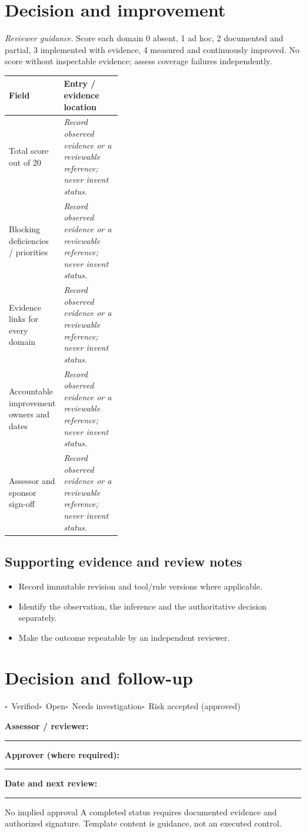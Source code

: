 \documentclass[10pt,letterpaper]{article}
\newcommand{\checkbox}{\(\square\)}
\newcommand{\blankline}{\noindent\rule{\linewidth}{0.35pt}\par\vspace{4pt}}
\begin{document}
\section{Decision and improvement}
\textit{Reviewer guidance.} Score each domain 0 absent, 1 ad hoc, 2 documented and partial, 3 implemented with evidence, 4 measured and continuously improved. No score without inspectable evidence; assess coverage failures independently.
\begin{tabularx}{\linewidth}{@{}p{0.38\linewidth}Y@{}}
\toprule Field & Entry / evidence location\\\midrule
Total score out of 20 & \textit{Record observed evidence or a reviewable reference; never invent status.}\\[1.0em]
\midrule
Blocking deficiencies / priorities & \textit{Record observed evidence or a reviewable reference; never invent status.}\\[1.0em]
\midrule
Evidence links for every domain & \textit{Record observed evidence or a reviewable reference; never invent status.}\\[1.0em]
\midrule
Accountable improvement owners and dates & \textit{Record observed evidence or a reviewable reference; never invent status.}\\[1.0em]
\midrule
Assessor and sponsor sign-off & \textit{Record observed evidence or a reviewable reference; never invent status.}\\[1.0em]
\midrule
\end{tabularx}
\subsection{Supporting evidence and review notes}
\begin{itemize}
\item Record immutable revision and tool/rule versions where applicable.
\item Identify the observation, the inference and the authoritative decision separately.
\item Make the outcome repeatable by an independent reviewer.
\end{itemize}
\clearpage
\section{Decision and follow-up}
\noindent\checkbox\ Verified\quad\checkbox\ Open\quad\checkbox\ Needs investigation\quad\checkbox\ Risk accepted (approved)\par
\noindent\textbf{Assessor / reviewer:}\par\blankline\textbf{Approver (where required):}\par\blankline\textbf{Date and next review:}\par\blankline
\begin{warnbox}{No implied approval}
A completed status requires documented evidence and authorized signature. Template content is guidance, not an executed control.\end{warnbox}
\end{document}
